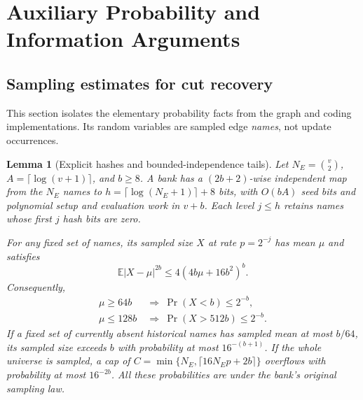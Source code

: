 \documentclass[11pt,letterpaper]{article}
\newtheorem{lemma}[theorem]{Lemma}
\numberwithin{equation}{section}
\newcommand{\E}{\mathbb E}
\begin{document}
\section{Auxiliary Probability and Information Arguments}
\label{app:probability-information}

\subsection{Sampling estimates for cut recovery}
\label{sec:sampling}

This section isolates the elementary probability facts from the graph and coding implementations.
Its random variables are sampled edge \emph{names}, not update occurrences.

\begin{lemma}[Explicit hashes and bounded-independence tails]
\label{lem:sampling}
Let $N_E=\binom{v}{2}$, $A=\lceil\log(v+1)\rceil$, and $b\ge8$.
A bank has a $(2b+2)$-wise independent map from the $N_E$ names to $h=\lceil\log(N_E+1)\rceil+8$ bits, with $O(bA)$ seed bits and polynomial setup and evaluation work in $v+b$.
Each level $j\le h$ retains names whose first $j$ hash bits are zero.

For any fixed set of names, its sampled size $X$ at rate $p=2^{-j}$ has mean $\mu$ and satisfies
\begin{equation}
\E|X-\mu|^{2b}\le4(4b\mu+16b^2)^b.
 \label{eq:sm1}
\end{equation}
Consequently,
\begin{equation}
\begin{aligned}
 \mu\ge64b&\ \Longrightarrow\ \Pr(X<b)\le2^{-b},\\
 \mu\le128b&\ \Longrightarrow\ \Pr(X>512b)\le2^{-b}.
 \end{aligned} \label{eq:sm2}
\end{equation}
If a fixed set of currently absent historical names has sampled mean at most $b/64$, its sampled size exceeds $b$ with probability at most $16^{-(b+1)}$.
If the \emph{whole universe} is sampled, a cap of $C=\min\{N_E,\lceil16N_E p+2b\rceil\}$ overflows with probability at most $16^{-2b}$.
All these probabilities are under the bank's original sampling law.
\end{lemma}
\end{document}
